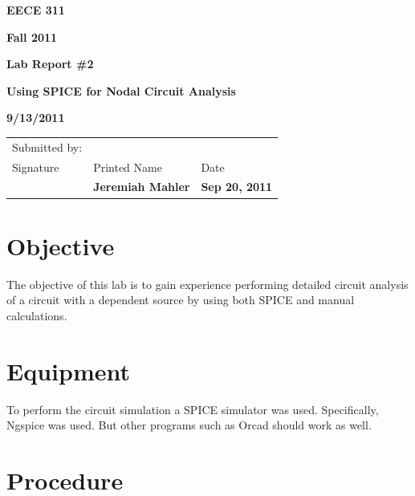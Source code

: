 \documentclass{article}
\begin{document}


\centerline{\bf EECE 311}
\centerline{\bf Fall 2011}
\centerline{\bf}
\centerline{\bf Lab Report \#2}
\centerline{\bf Using SPICE for Nodal Circuit Analysis}
\centerline{\bf 9/13/2011}  %

\begin{center}
\begin{tabularx}{\textwidth}[b]{X l l}
Submitted by: & & \\
Signature & Printed Name & Date \\
\hline
\multicolumn{1}{|X|}{} & \multicolumn{1}{|l|}{\bigstrut \bf Jeremiah Mahler} & \multicolumn{1}{|l|}{\bf Sep 20, 2011} \\
\hline
\end{tabularx}
\end{center}


\section{Objective}

The objective of this lab is to gain experience performing detailed
circuit analysis of a circuit with a dependent source by using both
SPICE and manual calculations.


\section{Equipment}

To perform the circuit simulation a SPICE\cite{wiki:SPICE} simulator was used.
Specifically, Ngspice\cite{NGSPICE} was used.
But other programs such as Orcad\cite{ORCAD} should work as well.


\section{Procedure}
\end{document}
